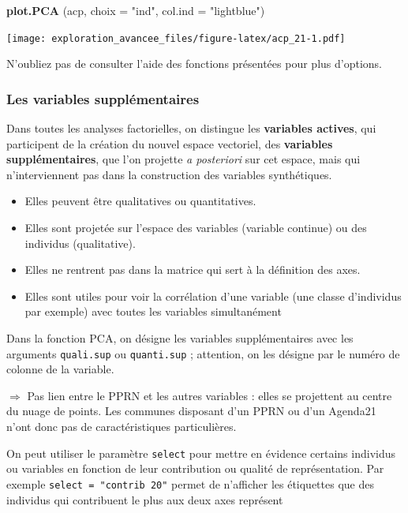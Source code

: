 \documentclass[]{book}
\newenvironment{Shaded}{\begin{snugshade}}{\end{snugshade}}
\newcommand{\DataTypeTok}[1]{\textcolor[rgb]{0.13,0.29,0.53}{#1}}
\newcommand{\KeywordTok}[1]{\textcolor[rgb]{0.13,0.29,0.53}{\textbf{#1}}}
\newcommand{\NormalTok}[1]{#1}
\newcommand{\StringTok}[1]{\textcolor[rgb]{0.31,0.60,0.02}{#1}}
\providecommand{\tightlist}{%
  \setlength{\itemsep}{0pt}\setlength{\parskip}{0pt}}
\begin{document}
\begin{Shaded}
\begin{Highlighting}[]
\KeywordTok{plot.PCA}\NormalTok{ (acp, }\DataTypeTok{choix =} \StringTok{"ind"}\NormalTok{, }\DataTypeTok{col.ind =} \StringTok{"lightblue"}\NormalTok{)}
\end{Highlighting}
\end{Shaded}

\texttt{[image: exploration\_avancee\_files/figure-latex/acp\_21-1.pdf]}

N'oubliez pas de consulter l'aide des fonctions présentées pour plus d'options.

\hypertarget{les-variables-supplementaires}{%
\subsubsection{Les variables supplémentaires}\label{les-variables-supplementaires}}

Dans toutes les analyses factorielles, on distingue les \textbf{variables actives}, qui participent de la création du nouvel espace vectoriel, des \textbf{variables supplémentaires}, que l'on projette \emph{a posteriori} sur cet espace, mais qui n'interviennent pas dans la construction des variables synthétiques.

\begin{itemize}
\tightlist
\item
  Elles peuvent être qualitatives ou quantitatives.
\item
  Elles sont projetée sur l'espace des variables (variable continue) ou des individus (qualitative).
\item
  Elles ne rentrent pas dans la matrice qui sert à la définition des axes.
\item
  Elles sont utiles pour voir la corrélation d'une variable (une classe d'individus par exemple) avec toutes les variables simultanément
\end{itemize}

Dans la fonction PCA, on désigne les variables supplémentaires avec les arguments \texttt{quali.sup} ou \texttt{quanti.sup} ; attention, on les désigne par le numéro de colonne de la variable.

\(\Rightarrow\) Pas lien entre le PPRN et les autres variables : elles se projettent au centre du nuage de points. Les communes disposant d'un PPRN ou d'un Agenda21 n'ont donc pas de caractéristiques particulières.

On peut utiliser le paramètre \texttt{select} pour mettre en évidence certains individus ou variables en fonction de leur contribution ou qualité de représentation. Par exemple \texttt{select\ =\ "contrib\ 20"} permet de n'afficher les étiquettes que des individus qui contribuent le plus aux deux axes représent
\end{document}
